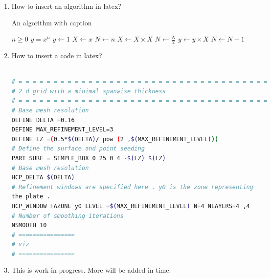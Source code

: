 \documentclass{article}
\begin{document}
\begin{enumerate}
\item How to insert an algorithm in latex?\\
\begin{algorithm}
\caption{An algorithm with caption}\label{alg:cap}
\begin{algorithmic}
\Require $n \geq 0$
\Ensure $y = x^n$
\State $y \gets 1$
\State $X \gets x$
\State $N \gets n$
    \State $X \gets X \times X$
    \State $N \gets \frac{N}{2}$  
    \State $y \gets y \times X$
    \State $N \gets N - 1$
\EndIf
\EndWhile
\end{algorithmic}
\end{algorithm}

\item How to insert a code in latex?\\
\begin{lstlisting}[language=bash, caption=An example of code listing]          % Start your code-block

# = = = = = = = = = = = = = = = = = = = = = = = = = = = = = = = = = = = =
# 2 d grid with a minimal spanwise thickness
# = = = = = = = = = = = = = = = = = = = = = = = = = = = = = = = = = = = =
# Base mesh resolution
DEFINE DELTA =0.16
DEFINE MAX_REFINEMENT_LEVEL=3
DEFINE LZ =(0.5*$(DELTA)/ pow (2 ,$(MAX_REFINEMENT_LEVEL)))
# Define the surface and point seeding
PART SURF = SIMPLE_BOX 0 25 0 4 -$(LZ) $(LZ)
# Base mesh resolution
HCP_DELTA $(DELTA)
# Refinement windows are specified here . y0 is the zone representing
the plate .
HCP_WINDOW FAZONE y0 LEVEL =$(MAX_REFINEMENT_LEVEL) N=4 NLAYERS=4 ,4
# Number of smoothing iterations
NSMOOTH 10
# ================
# viz
# ================
\end{lstlisting}

\item This is work in progress. More will be added in time.
\end{enumerate}
\end{document}
